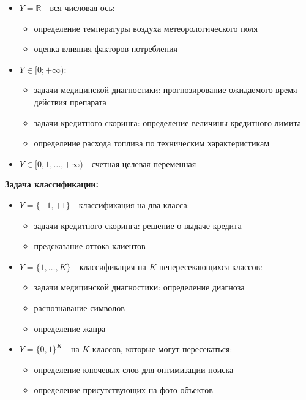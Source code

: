 \documentclass[%
10pt, %
final, %
oneside, %
onecolumn, %
centertags]{article} %
\theoremstyle{plain}
\theoremstyle{definition}
\theoremstyle{remark}
\begin{document}
\begin{itemize}
	\item $Y = \mathbb{R}$ - вся числовая ось:
	\begin{itemize}
		\item определение температуры воздуха метеорологического поля
		\item оценка влияния факторов потребления
	\end{itemize}
	\item $Y \in [0;+\infty)$:
	\begin{itemize}
		\item задачи медицинской диагностики: прогнозирование ожидаемого время действия препарата
		\item задачи кредитного скоринга: определение величины кредитного лимита
		\item определение расхода топлива по техническим характеристикам
	\end{itemize}
	\item $Y \in [0,1,\ldots,+\infty)$ - счетная целевая переменная
\end{itemize}

\textbf{Задача классификации:}

\begin{itemize}
	\item $Y = \{-1,+1\}$ - классификация на два класса:
	\begin{itemize}
		\item задачи кредитного скоринга: решение о выдаче кредита
		\item предсказание оттока клиентов
	\end{itemize}

	\item $Y = \{1,\ldots,K\}$ - классификация на $K$ непересекающихся классов:
	\begin{itemize}
		\item задачи медицинской диагностики: определение диагноза
		\item распознавание символов
		\item определение жанра
	\end{itemize}

	\item $Y = \{0,1\}^K$ - на $K$ классов, которые могут пересекаться:
	\begin{itemize}
		\item определение ключевых слов для оптимизации поиска
		\item определение присутствующих на фото объектов
	\end{itemize}
\end{itemize}
\end{document}
